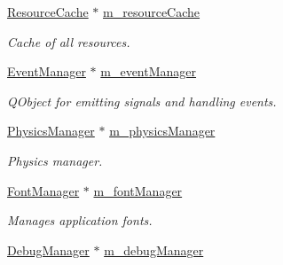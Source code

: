 \begin{Indent}
\begin{DoxyCompactItemize}
\mbox{\label{classrev_1_1_core_engine_af2f1e84bf98584e59be5dd354738649e}} 
\mbox{\hyperlink{classrev_1_1_resource_cache}{Resource\+Cache}} $\ast$ \mbox{\hyperlink{classrev_1_1_core_engine_af2f1e84bf98584e59be5dd354738649e}{m\+\_\+resource\+Cache}}
\begin{DoxyCompactList}\small\item\em Cache of all resources. \end{DoxyCompactList}\item 
\mbox{\label{classrev_1_1_core_engine_a07ff46370ef75be249dd1fd1a53e940b}} 
\mbox{\hyperlink{classrev_1_1_event_manager}{Event\+Manager}} $\ast$ \mbox{\hyperlink{classrev_1_1_core_engine_a07ff46370ef75be249dd1fd1a53e940b}{m\+\_\+event\+Manager}}
\begin{DoxyCompactList}\small\item\em Q\+Object for emitting signals and handling events. \end{DoxyCompactList}\item 
\mbox{\label{classrev_1_1_core_engine_abf549aa46dbf75a1649520647966e99a}} 
\mbox{\hyperlink{classrev_1_1_physics_manager}{Physics\+Manager}} $\ast$ \mbox{\hyperlink{classrev_1_1_core_engine_abf549aa46dbf75a1649520647966e99a}{m\+\_\+physics\+Manager}}
\begin{DoxyCompactList}\small\item\em Physics manager. \end{DoxyCompactList}\item 
\mbox{\label{classrev_1_1_core_engine_a126fec865019739fd0e08a4a278a10ca}} 
\mbox{\hyperlink{classrev_1_1_font_manager}{Font\+Manager}} $\ast$ \mbox{\hyperlink{classrev_1_1_core_engine_a126fec865019739fd0e08a4a278a10ca}{m\+\_\+font\+Manager}}
\begin{DoxyCompactList}\small\item\em Manages application fonts. \end{DoxyCompactList}\item 
\mbox{\label{classrev_1_1_core_engine_ac0cb5c2d56223d4dac2fd4349ffcd075}} 
\mbox{\hyperlink{classrev_1_1_debug_manager}{Debug\+Manager}} $\ast$ \mbox{\hyperlink{classrev_1_1_core_engine_ac0cb5c2d56223d4dac2fd4349ffcd075}{m\+\_\+debug\+Manager}}

\end{DoxyCompactItemize}
\end{Indent}
